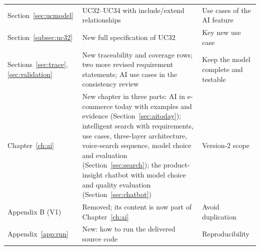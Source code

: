 \documentclass[11pt,a4paper,oneside]{extreport}
\newif\ifshowvtwo
\newcommand{\vtwocolor}{\ifshowvtwo\color{red}\fi}
\newenvironment{updated}{\par\vtwocolor}{\par}
\begin{document}
\begin{updated}
{\begin{xltabular}{\textwidth}{@{}L{3.2cm} Y L{3.6cm}@{}}
Section~\ref{sec:ucmodel} & UC32--UC34 with include/extend relationships & Use cases of the AI feature \\
Section~\ref{subsec:uc32} & New full specification of UC32 & Key new use case \\
Sections~\ref{sec:trace}, \ref{sec:validation} & New traceability and coverage rows; two more revised requirement statements; AI use cases in the consistency review & Keep the model complete and testable \\
Chapter~\ref{ch:ai} & New chapter in three parts: AI in e-commerce today with examples and evidence (Section~\ref{sec:aitoday}); intelligent search with requirements, use cases, three-layer architecture, voice-search sequence, model choice and evaluation (Section~\ref{sec:search}); the product-insight chatbot with model choice and quality evaluation (Section~\ref{sec:chatbot}) & Version-2 scope \\
Appendix B (V1) & Removed; its content is now part of Chapter~\ref{ch:ai} & Avoid duplication \\
Appendix~\ref{app:run} & New: how to run the delivered source code & Reproducibility \\
\end{xltabular}
}
\end{updated}
\end{document}
